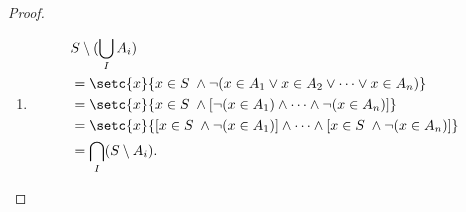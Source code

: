 \documentclass[../MathsNotesBase.tex]{subfiles}
\begin{document}
{\begin{proof}
\begin{enumerate}[label=(\roman*)]
				\bigskip
				\item
				\[\begin{aligned}
					&S \setminus (\bigcup_I A_i) \\
					&= \setc{x}{ x \in S \; \land \lnot (x \in A_1 \lor x \in A_2 \lor \cdots \lor x \in A_n) } &\sidecomment{} \\
					&= \setc{x}{ x \in S \; \land [\lnot (x \in A_1) \land \cdots \land \lnot (x \in A_n)] } &\sidecomment{} \\
					&= \setc{x}{ [x \in S \; \land \lnot (x \in A_1)] \land \cdots \land [x \in S \; \land \lnot (x \in A_n)] } &\sidecomment{} \\
					&= \bigcap_I (S \setminus A_i).
				\end{aligned}\]
			\end{enumerate}
		\end{proof}
	}
\end{document}
